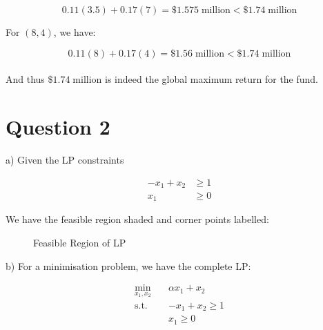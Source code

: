 \documentclass[12pt]{article}
\begin{document}
\begin{equation*}
    0.11(3.5) + 0.17(7) = \$ 1.575 \; \text{million} < \$ 1.74 \; \text{million}
\end{equation*}

\noindent For $(8, 4)$, we have: 

\begin{equation*}
    0.11(8) + 0.17(4) = \$ 1.56 \; \text{million} < \$ 1.74 \; \text{million}
\end{equation*} \\ 

\noindent And thus $\$ 1.74 \; \text{million}$ is indeed the global maximum return for the fund. 


\newpage 

\section*{Question 2}
a) Given the LP constraints 

\begin{align*}
    -x_{1} + x_{2} & \geq 1 \\ 
    x_{1} & \geq 0
\end{align*}

\noindent We have the feasible region shaded and corner points labelled: 

\begin{figure}[H]
    \centering
    \caption{Feasible Region of LP}
    \label{fig:2-feasiblelp2}
\end{figure} 

\noindent b) For a minimisation problem, we have the complete LP: 

\begin{align*}
    \min_{x_{1}, x_{2}} \quad & \alpha x_{1} + x_{2} \\ 
    \text{s.t.} \quad &-x_{1}+x_{2} \geq 1 \\
    & x_{1} \geq 0
\end{align*}
\end{document}
